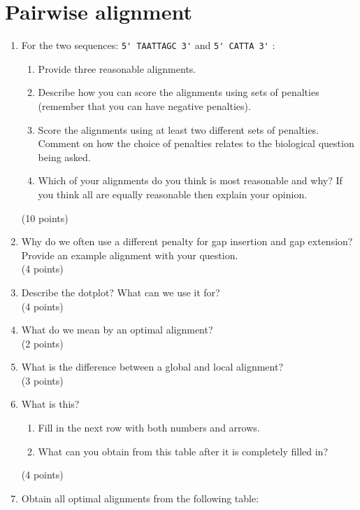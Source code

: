 \documentclass[11pt]{article}
\begin{document}
\section{Pairwise alignment}
\begin{enumerate}
\item For the two sequences: \verb|5' TAATTAGC 3'| and \verb|5' CATTA 3'| :
  \begin{enumerate}
    \item Provide three reasonable alignments.
    \item Describe how you can score the alignments using sets of penalties
      (remember that you can have negative penalties).
    \item Score the alignments using at least two different sets of
      penalties. Comment on how the choice of penalties relates to the
      biological question being asked.
    \item Which of your alignments do you think is most reasonable and why? If you
      think all are equally reasonable then explain your opinion.
  \end{enumerate}
  (10 points)
\item Why do we often use a different penalty for gap insertion and gap
  extension? Provide an example alignment with your question.\\
  (4 points)
\item Describe the dotplot? What can we use it for?\\
  (4 points)
\item What do we mean by an optimal alignment?\\
  (2 points)
\item What is the difference between a global and local alignment?\\
  (3 points)
\item What is this?
  \begin{figure}[H]
    \begin{tikzpicture}[scale=0.6]
      
    \end{tikzpicture}
  \end{figure}
  \begin{enumerate}
  \item Fill in the next row with both numbers and arrows.
  \item What can you obtain from this table after it is completely filled in?
  \end{enumerate}
  (4 points)
\item Obtain all optimal alignments from the following table:

\end{enumerate}
\end{document}
